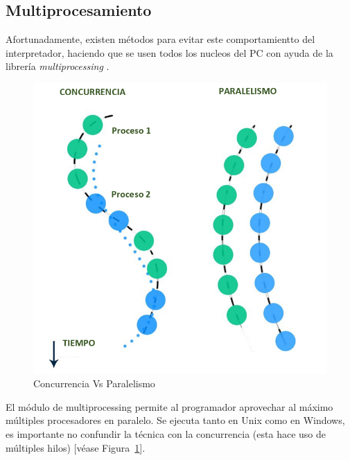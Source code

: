 \subsection{Multiprocesamiento}
Afortunadamente, existen métodos para evitar este comportamientto del interpretador, haciendo que se usen todos los nucleos del PC con ayuda de la librería \textit{multiprocessing} \parencite{Multiprocessing}.\newline
\begin{figure}[th]
    \centering
    \includegraphics[scale=.35]{Figures/Multiprocesamiento}
    \decoRule
    \caption[Concurrencia Vs Paralelismo]{Concurrencia  Vs Paralelismo}
    \label{fig:multiprocessing}
\end{figure}

El módulo de multiprocessing permite al programador aprovechar al máximo múltiples procesadores en paralelo. Se ejecuta tanto en Unix como en Windows, es importante no confundir la técnica con la concurrencia (esta hace uso de múltiples hilos) [véase Figura~\ref{fig:multiprocessing}].
\hfill 

\break







